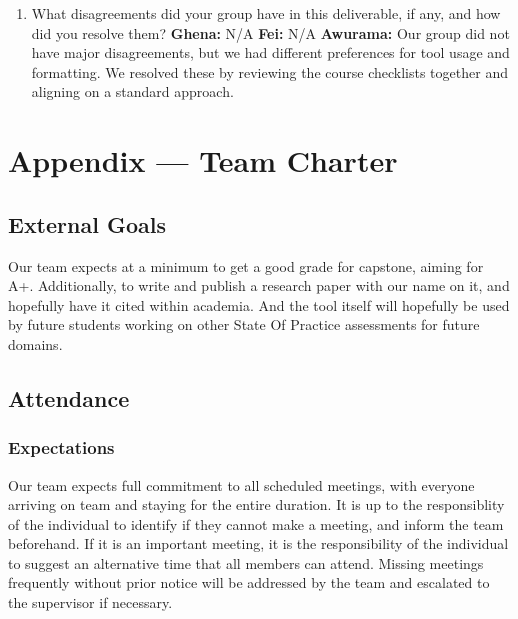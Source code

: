\documentclass{article}
\begin{document}
\begin{enumerate}
    \item What disagreements did your group have in this deliverable, if any,
    and how did you resolve them?
    \textbf{Ghena:} N/A
    \textbf{Fei:} N/A
    \textbf{Awurama:} Our group did not have major disagreements, but we had 
    different preferences for tool usage and formatting. We resolved these by reviewing 
    the course checklists together and aligning on a standard approach.
    
\end{enumerate}

\newpage{}

\section*{Appendix --- Team Charter}


\subsection*{External Goals}

Our team expects at a minimum to get a good grade for capstone, aiming for A+. Additionally, to write and publish a research paper with our name on it, and hopefully have it cited within academia.
And the tool itself will hopefully be used by future students working on other State Of Practice assessments for future domains.

\subsection*{Attendance}

\subsubsection*{Expectations}

Our team expects full commitment to all scheduled meetings, with everyone arriving on team and staying for the entire duration. It is up to the responsiblity of the individual to identify if they cannot make a meeting, and inform the team beforehand.
If it is an important meeting, it is the responsibility of the individual to suggest an alternative time that all members can attend. Missing meetings frequently without prior notice will be addressed by the team and escalated to the supervisor if necessary.
\end{document}
